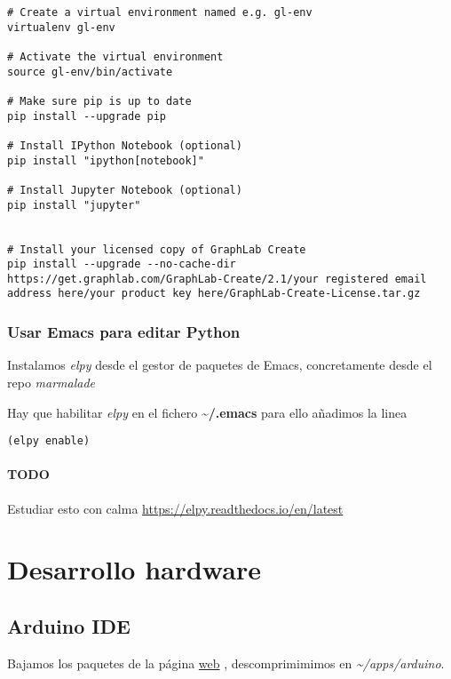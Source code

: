 \documentclass[12pt,spanish,]{article}
\let\oldparagraph\paragraph
\renewcommand{\paragraph}[1]{\oldparagraph{#1}\mbox{}}
\begin{document}
\begin{verbatim}
# Create a virtual environment named e.g. gl-env
virtualenv gl-env

# Activate the virtual environment
source gl-env/bin/activate

# Make sure pip is up to date
pip install --upgrade pip

# Install IPython Notebook (optional)
pip install "ipython[notebook]"

# Install Jupyter Notebook (optional)
pip install "jupyter"


# Install your licensed copy of GraphLab Create
pip install --upgrade --no-cache-dir https://get.graphlab.com/GraphLab-Create/2.1/your registered email address here/your product key here/GraphLab-Create-License.tar.gz
\end{verbatim}

\subsubsection{Usar Emacs para editar
Python}\label{usar-emacs-para-editar-python}

Instalamos \emph{elpy} desde el gestor de paquetes de Emacs,
concretamente desde el repo \emph{marmalade}

Hay que habilitar \emph{elpy} en el fichero
\textbf{\textasciitilde{}/.emacs} para ello añadimos la linea

\begin{verbatim}
(elpy enable)
\end{verbatim}

\paragraph{TODO}\label{todo}

Estudiar esto con calma \url{https://elpy.readthedocs.io/en/latest}

\section{Desarrollo hardware}\label{desarrollo-hardware}

\subsection{Arduino IDE}\label{arduino-ide}

Bajamos los paquetes de la página \href{https://www.arduino.cc}{web} ,
descomprimimimos en \emph{\textasciitilde{}/apps/arduino}.
\end{document}
